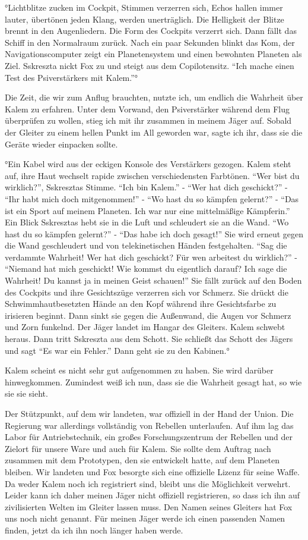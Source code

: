 \documentclass[11pt]{scrartcl}
\begin{document}
°Lichtblitze zucken im Cockpit, Stimmen verzerren sich, Echos hallen
immer lauter, übertönen jeden Klang, werden unerträglich. Die Helligkeit
der Blitze brennt in den Augenliedern. Die Form des Cockpits verzerrt
sich. Dann fällt das Schiff in den Normalraum zurück. Nach ein paar
Sekunden blinkt das Kom, der Navigationscomputer zeigt ein
Planetensystem und einen bewohnten Planeten als Ziel. Sskreszta nickt
Fox zu und steigt aus dem Copilotensitz. ``Ich mache einen Test des
Psiverstärkers mit Kalem.''°

Die Zeit, die wir zum Anflug brauchten, nutzte ich, um endlich die
Wahrheit über Kalem zu erfahren. Unter dem Vorwand, den Psiverstärker
während dem Flug überprüfen zu wollen, stieg ich mit ihr zusammen in
meinem Jäger auf. Sobald der Gleiter zu einem hellen Punkt im All
geworden war, sagte ich ihr, dass sie die Geräte wieder einpacken
sollte.

°Ein Kabel wird aus der eckigen Konsole des Verstärkers gezogen. Kalem
steht auf, ihre Haut wechselt rapide zwischen verschiedensten Farbtönen.
``Wer bist du wirklich?'', Sskresztas Stimme. ``Ich bin Kalem.'' - ``Wer
hat dich geschickt?'' - ``Ihr habt mich doch mitgenommen!'' - ``Wo hast
du so kämpfen gelernt?'' - ``Das ist ein Sport auf meinem Planeten. Ich
war nur eine mittelmäßige Kämpferin.'' Ein Blick Sskresztas hebt sie in
die Luft und schleudert sie an die Wand. ``Wo hast du so kämpfen
gelernt?'' - ``Das habe ich doch gesagt!'' Sie wird erneut gegen die
Wand geschleudert und von telekinetischen Händen festgehalten. ``Sag die
verdammte Wahrheit! Wer hat dich geschickt? Für wen arbeitest du
wirklich?'' - ``Niemand hat mich geschickt! Wie kommst du eigentlich
darauf? Ich sage die Wahrheit! Du kannst ja in meinen Geist schauen!''
Sie fällt zurück auf den Boden des Cockpits und ihre Gesichtszüge
verzerren sich vor Schmerz. Sie drückt die Schwimmhautbesetzten Hände an
den Kopf während ihre Gesichtsfarbe zu irisieren beginnt. Dann sinkt sie
gegen die Außenwand, die Augen vor Schmerz und Zorn funkelnd. Der Jäger
landet im Hangar des Gleiters. Kalem schwebt heraus. Dann tritt
Sskreszta aus dem Schott. Sie schließt das Schott des Jägers und sagt
``Es war ein Fehler.'' Dann geht sie zu den Kabinen.°

Kalem scheint es nicht sehr gut aufgenommen zu haben. Sie wird darüber
hinwegkommen. Zumindest weiß ich nun, dass sie die Wahrheit gesagt hat,
so wie sie sie sieht.

Der Stützpunkt, auf dem wir landeten, war offiziell in der Hand der
Union. Die Regierung war allerdings vollständig von Rebellen
unterlaufen. Auf ihm lag das Labor für Antriebstechnik, ein großes
Forschungszentrum der Rebellen und der Zielort für unsere Ware und auch
für Kalem. Sie sollte dem Auftrag nach zusammen mit dem Prototypen, den
sie entwickelt hatte, auf dem Planeten bleiben. Wir landeten und Fox
besorgte sich eine offizielle Lizenz für seine Waffe. Da weder Kalem
noch ich registriert sind, bleibt uns die Möglichkeit verwehrt. Leider
kann ich daher meinen Jäger nicht offiziell registrieren, so dass ich
ihn auf zivilisierten Welten im Gleiter lassen muss. Den Namen seines
Gleiters hat Fox uns noch nicht genannt. Für meinen Jäger werde ich
einen passenden Namen finden, jetzt da ich ihn noch länger haben werde.
\end{document}
